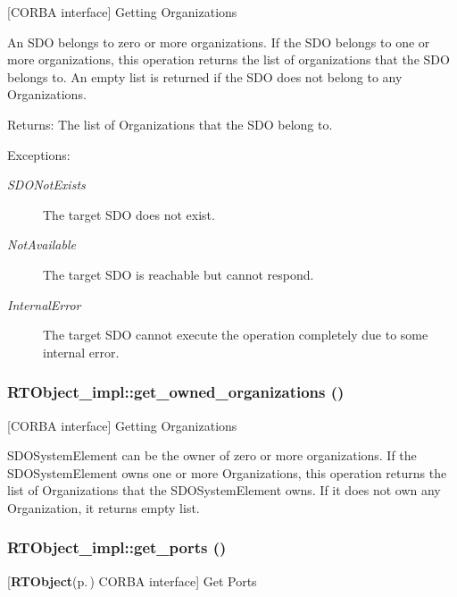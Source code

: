 [CORBA interface] Getting Organizations 

An SDO belongs to zero or more organizations. If the SDO belongs to one or more organizations, this operation returns the list of organizations that the SDO belongs to. An empty list is returned if the SDO does not belong to any Organizations.

\begin{Desc}
\item[Returns:]The list of Organizations that the SDO belong to. \end{Desc}
\begin{Desc}
\item[Exceptions:]
\begin{description}
\item[{\em SDONot\-Exists}]The target SDO does not exist. \item[{\em Not\-Available}]The target SDO is reachable but cannot respond. \item[{\em Internal\-Error}]The target SDO cannot execute the operation completely due to some internal error.\end{description}
\end{Desc}
\subsubsection{\setlength{\rightskip}{0pt plus 5cm}RTObject\_\-impl::get\_\-owned\_\-organizations ()}\label{classRTObject__impl_RTObject__impla36}


[CORBA interface] Getting Organizations 

SDOSystem\-Element can be the owner of zero or more organizations. If the SDOSystem\-Element owns one or more Organizations, this operation returns the list of Organizations that the SDOSystem\-Element owns. If it does not own any Organization, it returns empty list.
\subsubsection{\setlength{\rightskip}{0pt plus 5cm}RTObject\_\-impl::get\_\-ports ()}\label{classRTObject__impl_RTObject__impla20}


[{\bf RTObject}{\rm (p.\,\pageref{namespaceRTObject})} CORBA interface] Get Ports 


